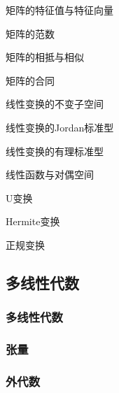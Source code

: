 矩阵的特征值与特征向量

矩阵的范数

矩阵的相抵与相似

矩阵的合同

线性变换的不变子空间

线性变换的Jordan标准型

线性变换的有理标准型

线性函数与对偶空间


U变换

Hermite变换

正规变换

\subsection{多线性代数}

\subsubsection{多线性代数}

\begin{defination}[多线性代数]

\end{defination}

\subsubsection{张量}
\label{sec:03}


\begin{defination}[张量]

\end{defination}

\begin{example}[多元函数的任意解导数]

\end{example}


\subsubsection{外代数}
\label{sec:04}
